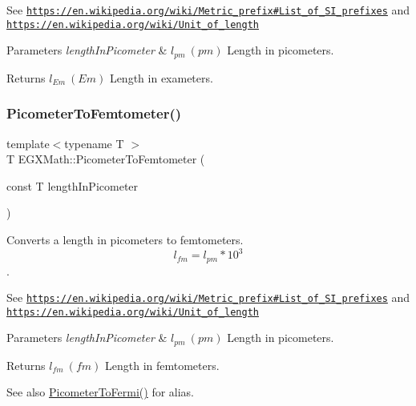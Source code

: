 See \href{https://en.wikipedia.org/wiki/Metric_prefix#List_of_SI_prefixes}{\tt https\+://en.\+wikipedia.\+org/wiki/\+Metric\+\_\+prefix\#\+List\+\_\+of\+\_\+\+S\+I\+\_\+prefixes} and \href{https://en.wikipedia.org/wiki/Unit_of_length}{\tt https\+://en.\+wikipedia.\+org/wiki/\+Unit\+\_\+of\+\_\+length} 
\begin{DoxyParams}{Parameters}
{\em length\+In\+Picometer} & $ l_{pm}\ (pm)$ Length in picometers. \\
\hline
\end{DoxyParams}
\begin{DoxyReturn}{Returns}
$ l_{Em}\ (Em)$ Length in exameters. 
\end{DoxyReturn}
\mbox{\label{group___e_g_x_math-_conversions-_length_conversions-_picometer-_s_i_gabdc7e9ceb6baa9da4cee4b791084fb2a}} 
\subsubsection{\texorpdfstring{Picometer\+To\+Femtometer()}{PicometerToFemtometer()}}
{\footnotesize\ttfamily template$<$typename T $>$ \\
T E\+G\+X\+Math\+::\+Picometer\+To\+Femtometer (\begin{DoxyParamCaption}\item[{const T}]{length\+In\+Picometer }\end{DoxyParamCaption})}



Converts a length in picometers to femtometers. \[ l_{fm}=l_{pm} * 10^{3} \]. 

See \href{https://en.wikipedia.org/wiki/Metric_prefix#List_of_SI_prefixes}{\tt https\+://en.\+wikipedia.\+org/wiki/\+Metric\+\_\+prefix\#\+List\+\_\+of\+\_\+\+S\+I\+\_\+prefixes} and \href{https://en.wikipedia.org/wiki/Unit_of_length}{\tt https\+://en.\+wikipedia.\+org/wiki/\+Unit\+\_\+of\+\_\+length} 
\begin{DoxyParams}{Parameters}
{\em length\+In\+Picometer} & $ l_{pm}\ (pm)$ Length in picometers. \\
\hline
\end{DoxyParams}
\begin{DoxyReturn}{Returns}
$ l_{fm}\ (fm)$ Length in femtometers. 
\end{DoxyReturn}
\begin{DoxySeeAlso}{See also}
\mbox{\hyperlink{group___e_g_x_math-_conversions-_length_conversions-_picometer-_non-_s_i_ga13ec47b0b50eca30313bb7902a28f0c9}{Picometer\+To\+Fermi()}} for alias. 
\end{DoxySeeAlso}
\mbox{\label{group___e_g_x_math-_conversions-_length_conversions-_picometer-_s_i_ga9dbf38a2c9eb2f88b4e5061861ec42de}} 
